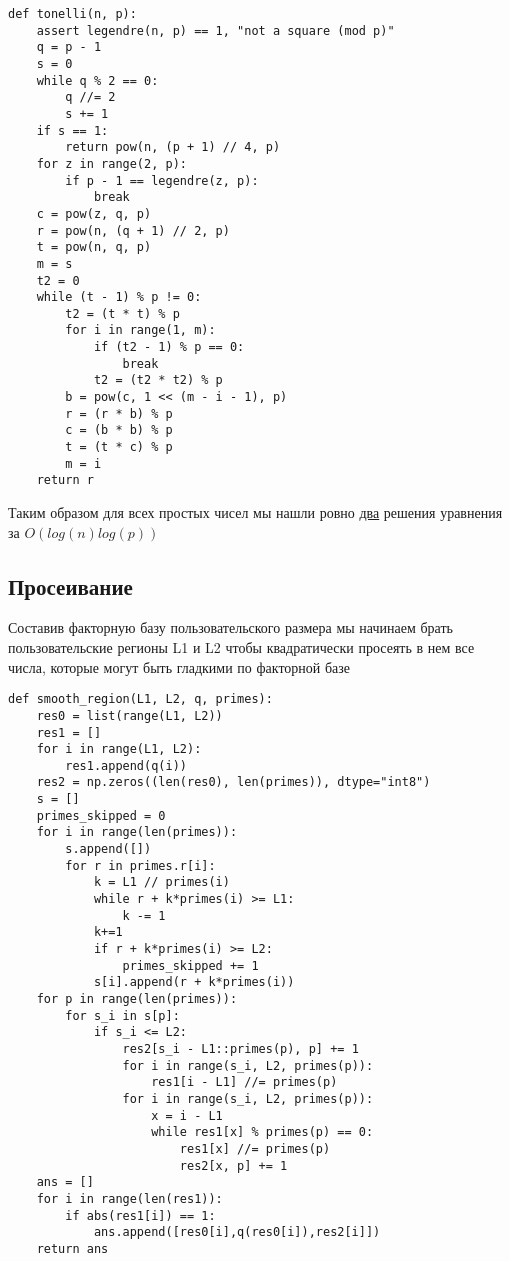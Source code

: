 \begin{lstlisting}
def tonelli(n, p):
    assert legendre(n, p) == 1, "not a square (mod p)"
    q = p - 1
    s = 0
    while q % 2 == 0:
        q //= 2
        s += 1
    if s == 1:
        return pow(n, (p + 1) // 4, p)
    for z in range(2, p):
        if p - 1 == legendre(z, p):
            break
    c = pow(z, q, p)
    r = pow(n, (q + 1) // 2, p)
    t = pow(n, q, p)
    m = s
    t2 = 0
    while (t - 1) % p != 0:
        t2 = (t * t) % p
        for i in range(1, m):
            if (t2 - 1) % p == 0:
                break
            t2 = (t2 * t2) % p
        b = pow(c, 1 << (m - i - 1), p)
        r = (r * b) % p
        c = (b * b) % p
        t = (t * c) % p
        m = i
    return r
\end{lstlisting}

Таким образом для всех простых чисел мы нашли ровно \underline{два} решения уравнения за $O(log(n)log(p))$


\subsection{Просеивание}

Составив факторную базу пользовательского размера мы начинаем брать пользовательские регионы L1 и L2 чтобы квадратически просеять в нем все числа, которые могут быть гладкими по факторной базе

\begin{lstlisting}
def smooth_region(L1, L2, q, primes):
    res0 = list(range(L1, L2))
    res1 = []
    for i in range(L1, L2):
        res1.append(q(i))
    res2 = np.zeros((len(res0), len(primes)), dtype="int8")
    s = []
    primes_skipped = 0
    for i in range(len(primes)):
        s.append([])
        for r in primes.r[i]:
            k = L1 // primes(i)
            while r + k*primes(i) >= L1:
                k -= 1
            k+=1
            if r + k*primes(i) >= L2:
                primes_skipped += 1
            s[i].append(r + k*primes(i))
    for p in range(len(primes)):
        for s_i in s[p]:
            if s_i <= L2:
                res2[s_i - L1::primes(p), p] += 1
                for i in range(s_i, L2, primes(p)):
                    res1[i - L1] //= primes(p)
                for i in range(s_i, L2, primes(p)):
                    x = i - L1
                    while res1[x] % primes(p) == 0:
                        res1[x] //= primes(p)
                        res2[x, p] += 1
    ans = []
    for i in range(len(res1)):
        if abs(res1[i]) == 1:
            ans.append([res0[i],q(res0[i]),res2[i]])
    return ans
\end{lstlisting} 

